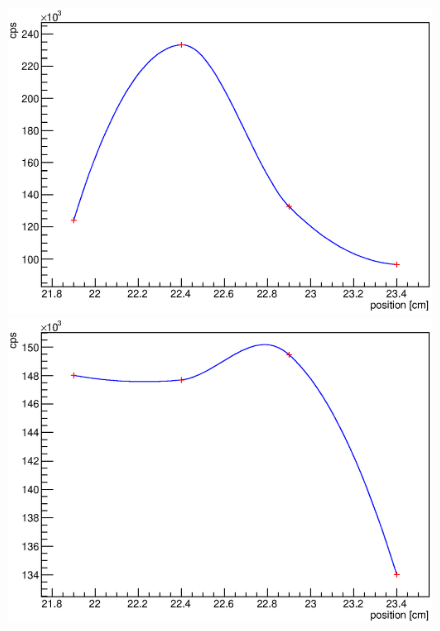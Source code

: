 \begin{figure}
	\begin{minipage}[d]{0.24 \textwidth}
		  \includegraphics[width=\textwidth]{graphics/cobalt/modules/3A.eps}
	\end{minipage}
\begin{minipage}[d]{0.24 \textwidth}
		  \includegraphics[width=\textwidth]{graphics/cobalt/modules/3B.eps}
	\end{minipage}
	\begin{minipage}[d]{0.24 \textwidth}

\end{minipage}
\end{figure}
